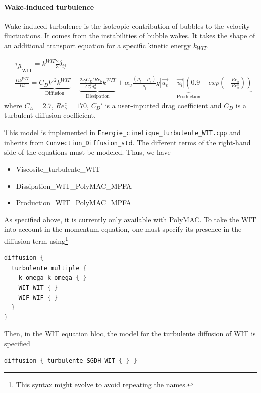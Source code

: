 \paragraph{Wake-induced turbulence}\mbox{}

Wake-induced turbulence is the isotropic contribution of bubbles to the velocity fluctuations. It comes from the instabilities of bubble wakes. It takes the shape of an additional transport equation for a specific kinetic energy $k_{WIT}$.

\begin{align}
	&\underline{\underline{\tau_R}}_{\text{WIT}} = k^{WIT}\frac{2}{3}\delta_{ij}\\
	&\frac{D k^{WIT}}{Dt} =
			\underbrace{C_D\nabla^2 k^{WIT} }_\text{Diffusion}
				- \underbrace{\frac{2 \nu_l C_D' Re_b}{C_\Lambda^2 d_b^2}k^{WIT} }_\text{Dissipation}
				+ \underbrace{\alpha_v \frac{(\rho_l-\rho_v)}{\rho_l} g |\vec{u_v}-\vec{u_l}|\left(0.9 - exp\left(-\frac{Re_b}{Re_b^c}\right)\right) }_\text{Production}
\end{align}
where $C_\Lambda = 2.7$, $Re_b^c = 170$, $C_D'$ is a user-inputted drag coefficient and $C_D$ is a turbulent diffusion coefficient.

This model is implemented in \texttt{Energie_cinetique_turbulente_WIT.cpp} and inherits from \texttt{Convection_Diffusion_std}. The different terms of the right-hand side of the equations must be modeled. Thus, we have
\begin{itemize}
    \item Viscosite_turbulente_WIT
    \item Dissipation_WIT_PolyMAC_MPFA
    \item Production_WIT_PolyMAC_MPFA
\end{itemize}

As specified above, it is currently only available with PolyMAC. To take the WIT into account in the momentum equation, one must specify its presence in the diffusion term using\footnote{This syntax might evolve to avoid repeating the names.}

\begin{lstlisting}[language=c++]
diffusion {
  turbulente multiple {
    k_omega k_omega { }
    WIT WIT { }
    WIF WIF { }
  }
}
\end{lstlisting}

Then, in the WIT equation bloc, the model for the turbulente diffusion of WIT is specified
\begin{lstlisting}[language=c++]
diffusion { turbulente SGDH_WIT { } }
\end{lstlisting}

